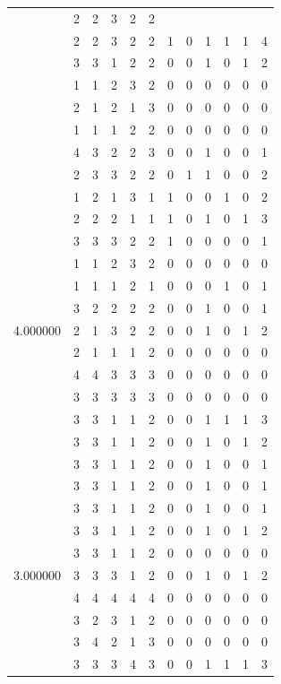 \documentclass[]{book}
\theoremstyle{definition}
\theoremstyle{definition}
\theoremstyle{definition}
\theoremstyle{remark}
\begin{document}
\begin{table}
{\begin{tabular}[t]{rrrrrrrrrrrr}
 & 2 & 2 & 3 & 2 & 2 &  &  &  &  &  & \\
 & 2 & 2 & 3 & 2 & 2 & 1 & 0 & 1 & 1 & 1 & 4\\
 & 3 & 3 & 1 & 2 & 2 & 0 & 0 & 1 & 0 & 1 & 2\\
 & 1 & 1 & 2 & 3 & 2 & 0 & 0 & 0 & 0 & 0 & 0\\
 & 2 & 1 & 2 & 1 & 3 & 0 & 0 & 0 & 0 & 0 & 0\\
 & 1 & 1 & 1 & 2 & 2 & 0 & 0 & 0 & 0 & 0 & 0\\
 & 4 & 3 & 2 & 2 & 3 & 0 & 0 & 1 & 0 & 0 & 1\\
 & 2 & 3 & 3 & 2 & 2 & 0 & 1 & 1 & 0 & 0 & 2\\
 & 1 & 2 & 1 & 3 & 1 & 1 & 0 & 0 & 1 & 0 & 2\\
 & 2 & 2 & 2 & 1 & 1 & 1 & 0 & 1 & 0 & 1 & 3\\
 & 3 & 3 & 3 & 2 & 2 & 1 & 0 & 0 & 0 & 0 & 1\\
 & 1 & 1 & 2 & 3 & 2 & 0 & 0 & 0 & 0 & 0 & 0\\
 & 1 & 1 & 1 & 2 & 1 & 0 & 0 & 0 & 1 & 0 & 1\\
 & 3 & 2 & 2 & 2 & 2 & 0 & 0 & 1 & 0 & 0 & 1\\
4.000000 & 2 & 1 & 3 & 2 & 2 & 0 & 0 & 1 & 0 & 1 & 2\\
 & 2 & 1 & 1 & 1 & 2 & 0 & 0 & 0 & 0 & 0 & 0\\
 & 4 & 4 & 3 & 3 & 3 & 0 & 0 & 0 & 0 & 0 & 0\\
 & 3 & 3 & 3 & 3 & 3 & 0 & 0 & 0 & 0 & 0 & 0\\
 & 3 & 3 & 1 & 1 & 2 & 0 & 0 & 1 & 1 & 1 & 3\\
 & 3 & 3 & 1 & 1 & 2 & 0 & 0 & 1 & 0 & 1 & 2\\
 & 3 & 3 & 1 & 1 & 2 & 0 & 0 & 1 & 0 & 0 & 1\\
 & 3 & 3 & 1 & 1 & 2 & 0 & 0 & 1 & 0 & 0 & 1\\
 & 3 & 3 & 1 & 1 & 2 & 0 & 0 & 1 & 0 & 0 & 1\\
 & 3 & 3 & 1 & 1 & 2 & 0 & 0 & 1 & 0 & 1 & 2\\
 & 3 & 3 & 1 & 1 & 2 & 0 & 0 & 0 & 0 & 0 & 0\\
3.000000 & 3 & 3 & 3 & 1 & 2 & 0 & 0 & 1 & 0 & 1 & 2\\
 & 4 & 4 & 4 & 4 & 4 & 0 & 0 & 0 & 0 & 0 & 0\\
 & 3 & 2 & 3 & 1 & 2 & 0 & 0 & 0 & 0 & 0 & 0\\
 & 3 & 4 & 2 & 1 & 3 & 0 & 0 & 0 & 0 & 0 & 0\\
 & 3 & 3 & 3 & 4 & 3 & 0 & 0 & 1 & 1 & 1 & 3\\

\end{tabular}}
\end{table}
\end{document}
